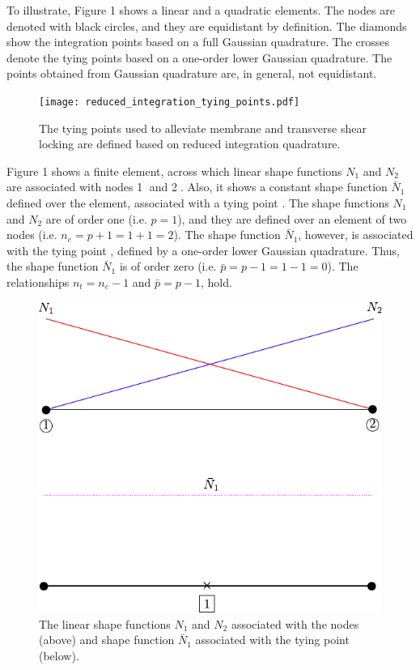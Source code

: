 \documentclass[12pt]{article}
\begin{document}
To illustrate, Figure 1 shows a linear and a quadratic elements. The nodes are denoted with black circles, and they are equidistant by definition. The diamonds show the integration points based on a full Gaussian quadrature. The crosses denote the tying points based on a one-order lower Gaussian quadrature. The points obtained from Gaussian quadrature are, in general, not equidistant.

\begin{figure}[hbt!]
\centering
\texttt{[image: reduced\_integration\_tying\_points.pdf]}
\caption{The tying points used to alleviate membrane and transverse shear locking are defined based on reduced integration quadrature.}
\end{figure}


Figure 1 shows a finite element, across which linear shape functions $N_1$ and $N_2$ are associated with nodes \textcircled{1} and \textcircled{2}. Also, it shows a constant shape function $\bar{N}_1$ defined over the element, associated with a tying point . The shape functions $N_1$ and $N_2$ are of order one (i.e. $p=1$), and they are defined over an element of two nodes (i.e. $n_e = p+1 = 1+1 = 2$). The shape function $\bar{N}_1$, however, is associated with the tying point , defined by a one-order lower Gaussian quadrature. Thus, the shape function $\bar{N}_1$ is of order zero (i.e. $\bar{p} = p-1 = 1-1 = 0$). The relationships $n_t = n_e -1$ and $\bar{p} = p - 1$, hold.

\begin{figure}[hbt!]
\centering
\includegraphics[scale=1]{linear_shape_functions_vs_tying_point.pdf}
\caption{The linear shape functions $N_1$ and $N_2$ associated with the nodes (above) and shape function $\bar{N}_1$ associated with the tying point (below).}
\end{figure}
\end{document}
